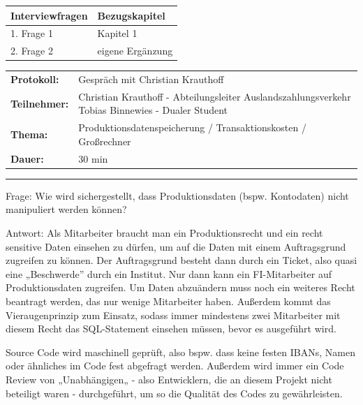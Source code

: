 
\label{Anhang 1 - Interviewleitfaden für das Interview mit Christian Krauthoff}

\begin{tabular}{|p{10cm}|p{4cm}|}
    \hline
    \textbf{Interviewfragen} & \textbf{Bezugskapitel} \\
    \hline
    1. Frage 1 & Kapitel 1 \\
    \hline
    2. Frage 2 & eigene Ergänzung \\
    \hline
    \end{tabular}

\newpage

\label{appendix: Anhang 3}

\begin{tabular}{p{2.5 cm}p{11.8 cm}}
\textbf{Protokoll:} & Gespräch mit Christian Krauthoff \\
\textbf{Teilnehmer:} & Christian Krauthoff - Abteilungsleiter Auslandszahlungsverkehr \break Tobias Binnewies - Dualer Student \\
\textbf{Thema:} & Produktionsdatenspeicherung / Transaktionskosten / Großrechner \\
\textbf{Dauer:} & 30 min
\end{tabular}
\bigbreak
\noindent\rule[1ex]{\textwidth}{1pt} %
\bigbreak

Frage: 
Wie wird sichergestellt, dass Produktionsdaten (bspw. Kontodaten) nicht manipuliert werden können?

\bigbreak
Antwort: 
Als Mitarbeiter braucht man ein Produktionsrecht und ein recht sensitive Daten einsehen zu dürfen, um auf die Daten mit einem Auftragsgrund zugreifen zu können. Der Auftragsgrund besteht dann durch ein Ticket, also quasi eine „Beschwerde” durch ein Institut.
Nur dann kann ein FI-Mitarbeiter auf Produktionsdaten zugreifen.
Um Daten abzuändern muss noch ein weiteres Recht beantragt werden, das nur wenige Mitarbeiter haben.
Außerdem kommt das Vieraugenprinzip zum Einsatz, sodass immer mindestens zwei Mitarbeiter mit diesem Recht das SQL-Statement einsehen müssen, bevor es ausgeführt wird.

\noindent
Source Code wird maschinell geprüft, also bspw. dass keine festen IBANs, Namen oder ähnliches im Code fest abgefragt werden.
Außerdem wird immer ein Code Review von „Unabhängigen„ - also Entwicklern, die an diesem Projekt nicht beteiligt waren - durchgeführt, um so die Qualität des Codes zu gewährleisten.


